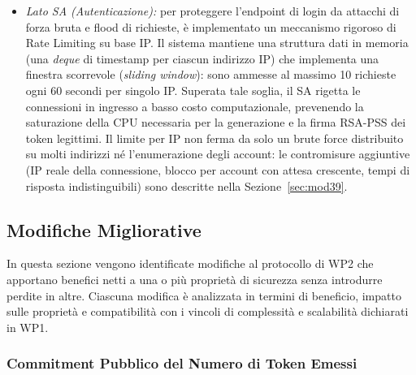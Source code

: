 \documentclass[12pt,a4paper]{article}
\begin{document}
\begin{itemize}
\begin{itemize}
      \item \textit{Lato SA (Autenticazione):} per proteggere l'endpoint di login da attacchi di forza bruta e flood di richieste, è implementato un meccanismo rigoroso di Rate Limiting su base IP. Il sistema mantiene una struttura dati in memoria (una \textit{deque} di timestamp per ciascun indirizzo IP) che implementa una finestra scorrevole (\textit{sliding window}): sono ammesse al massimo 10 richieste ogni 60 secondi per singolo IP. Superata tale soglia, il SA rigetta le connessioni in ingresso a basso costo computazionale, prevenendo la saturazione della CPU necessaria per la generazione e la firma RSA-PSS dei token legittimi. Il limite per IP non ferma da solo un brute force distribuito su molti indirizzi né l'enumerazione degli account: le contromisure aggiuntive (IP reale della connessione, blocco per account con attesa crescente, tempi di risposta indistinguibili) sono descritte nella Sezione~\ref{sec:mod39}.
    \end{itemize}
\end{itemize}

\subsection{Modifiche Migliorative}

In questa sezione vengono identificate modifiche al protocollo di WP2 che apportano benefici netti a una o più proprietà di sicurezza senza introdurre perdite in altre. Ciascuna modifica è analizzata in termini di beneficio, impatto sulle proprietà e compatibilità con i vincoli di complessità e scalabilità dichiarati in WP1.

\subsubsection{Commitment Pubblico del Numero di Token Emessi}
\label{sec:mod31}
\end{document}
